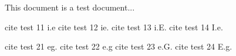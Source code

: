 \documentclass{article}
\begin{document}
This document is a test document...

cite test 11 i.e
cite test 12 ie.
cite test 13 i.E.
cite test 14 I.e.

cite test 21 eg.
cite test 22 e.g
cite test 23 e.G.
cite test 24 E.g.
\end{document}
